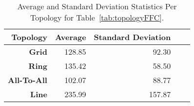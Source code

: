 \begin{table}
\centering
\caption{Average and Standard Deviation Statistics Per Topology for Table~\ref{tab:topologyFFC}.}
\label{tab:topologyStat}
\vspace{2pt}
\begin{tabular}{|r|r|r|r|r|} \hline
Topology                & Average    & Standard Deviation \\ \hline
{\bf Grid}              & 128.85     & 92.30 \\ \hline  
{\bf Ring}              & 135.42     & 58.50  \\ \hline  
{\bf All-To-All}        & 102.07     & 88.77  \\ \hline  
{\bf Line}              & 235.99     & 157.87 \\ \hline  
\end{tabular}
\end{table}